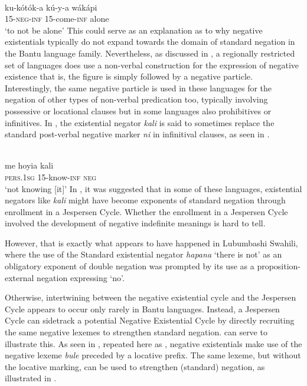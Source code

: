 \documentclass[output=paper,draft,draftmode,colorlinks,citecolor=brown]{langscibook}
\begin{document}
\ea\label{ex:manda-alone}
\\
\gll ku-k{\'o}t{\'o}k-a kú-y-a wákápi\\
15-\textsc{neg-inf} 15-come-\textsc{inf} alone\\
\glt `to not be alone'
\z
%
This could serve as an explanation as to why negative existentials typically do not expand towards the domain of standard negation in the Bantu language family. Nevertheless, as discussed in , a regionally restricted set of languages does use a non-verbal construction for the expression of negative existence \textendash that is, the figure is simply followed by a negative particle. Interestingly, the same negative particle is used in these languages for the negation of other types of non-verbal predication too, typically involving possessive or locational clauses but in some languages also prohibitives or infinitives. In , the existential negator \textit{kali} is said to sometimes replace the standard post-verbal negative marker \textit{ni} in infinitival clauses, as seen in .
%

\ea\label{ex:mbete-know}
\\
\gll me hoyia kali\\
\textsc{pers.1sg} 15-know-\textsc{inf} \textsc{neg}\\
\glt `not knowing [it]'
\z
In , it was suggested that in some of these languages, existential negators like \textit{kali} might have become exponents of standard negation through enrollment in a Jespersen Cycle. Whether the enrollment in a Jespersen Cycle involved the development of negative indefinite meanings is hard to tell.

However, that is exactly what appears to have happened in
Lubumbashi Swahili, where the use of the Standard  existential negator \textit{hapana} `there is not' as an obligatory exponent of double negation was prompted by its use as a proposition-external negation
expressing `no'.

Otherwise, intertwining between the negative existential cycle and the Jespersen Cycle appears to occur only rarely in Bantu languages. Instead, a Jespersen Cycle can sidetrack a potential Negative Existential Cycle by directly recruiting the same negative lexemes to strengthen standard negation.  can serve to illustrate this. As seen in , repeated here as , negative existentials make use of the negative lexeme \textit{bule} preceded by a locative prefix. The same lexeme, but without the locative marking, can be used to strengthen (standard) negation, as illustrated in .
%
\end{document}
